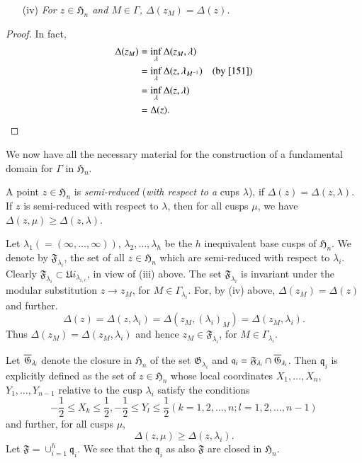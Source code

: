 \begin{itemize}
\item[(iv)] {\em For $z\in\mathfrak{H}_{n}$ and $M\in\Gamma$,
  $\Delta(z_{M})=\Delta(z)$.} 
\end{itemize}

\begin{proof}
In fact,
\begin{align*}
\Delta(z_{M}) &= \inf\limits_{\lambda}\Delta(z_{M},\lambda)\\
&= \inf\limits_{\lambda}\Delta(z,\lambda_{M^{-1}}) \quad \text{(by \eqref{151})}\\
&= \inf\limits_{\lambda}\Delta(z,\lambda)\\
&=\Delta(z).
\end{align*}
\end{proof}

We now have all the necessary material for the construction of a
fundamental domain for $\Gamma$ in $\mathfrak{H}_{n}$.

A point $z\in\mathfrak{H}_{n}$ is {\em semi-reduced} ({\em with
  respect to a} cups $\lambda$), if $\Delta(z)=\Delta(z,\lambda)$. If
$z$ is semi-reduced with respect to $\lambda$, then for all cusps
$\mu$, we have $\Delta(z,\mu)\geq \Delta(z,\lambda)$.

Let $\lambda_{1}(=(\infty,\ldots,\infty))$,
$\lambda_{2},\ldots,\lambda_{h}$ be the $h$ inequivalent base cusps of
$\mathfrak{H}_{n}$. We denote by $\mathfrak{F}_{\lambda_{i}}$, the set
of all $z\in\mathfrak{H}_{n}$ which are semi-reduced with respect to
$\lambda_{i}$. Clearly $\mathfrak{F}_{\lambda_{i}}\subset
\mathfrak{U}i_{\lambda_{i,c}}$, in view of (iii) above. The set
$\mathfrak{F}_{\lambda_{i}}$ is invariant under the modular
substitution $z\to z_{M}$, for $M\in\Gamma_{\lambda_{i}}$. For, by
(iv) above, $\Delta(z_{M})=\Delta(z)$ and further.
$$
\Delta(z)=\Delta(z,\lambda_{i})=\Delta(z_{M},(\lambda_{i})_{M})=\Delta(z_{M},\lambda_{i}). 
$$
Thus $\Delta(z_{M})=\Delta(z_{M},\lambda_{i})$ and hence $z_{M}\in
\mathfrak{F}_{\lambda_{i}}$, for $M\in\Gamma_{\lambda_{i}}$. 

Let $\overline{\mathfrak{G}}_{\lambda_{i}}$ denote the closure in
$\mathfrak{H}_{n}$ of the set $\mathfrak{G}_{\lambda_{i}}$ and
$\mathfrak{q}_{i}=\mathfrak{F}_{\lambda_{i}}\cap
\overline{\mathfrak{G}}_{\lambda_{i}}$. Then $\mathfrak{q}_{i}$ is
explicitly defined as the set of $z\in\mathfrak{H}_{n}$ whose local
coordinates $X_{1},\ldots,X_{n}$,\pageoriginale $Y_{1},\ldots,Y_{n-1}$
relative to the cusp $\lambda_{i}$ satisfy the conditions
$$
-\frac{1}{2}\leq X_{k}\leq \frac{1}{2},-\frac{1}{2}\leq Y_{l}\leq
\frac{1}{2}(k=1,2,\ldots,n;l=1,2,\ldots,n-1) 
$$
and further, for all cusps $\mu$,
$$
\Delta(z,\mu)\geq \Delta(z,\lambda_{i}).
$$
Let $\mathfrak{F}=\cup^{h}_{i=1}\mathfrak{q}_{i}$. We see that the
$\mathfrak{q}_{i}$ as also $\mathfrak{F}$ are closed in
$\mathfrak{H}_{n}$.

